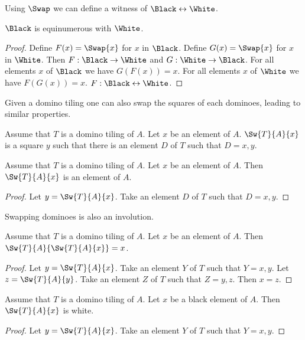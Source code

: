 Using $\Swap$ we can define a witness of $\Black \leftrightarrow \White$.

\begin{forthel}
    \begin{lemma}
        $\Black$ is equinumerous with $\White$.
    \end{lemma}
    \begin{proof}
        Define $F(x) = \Swap{x}$ for $x$ in $\Black$.
        Define $G(x) = \Swap{x}$ for $x$ in $\White$.
        Then $F : \Black \to \White$ and $G : \White \to \Black$.
        For all elements $x$ of $\Black$ we have $G(F(x)) = x$.
        For all elements $x$ of $\White$ we have $F(G(x)) = x$.
        $F : \Black \leftrightarrow \White$.
    \end{proof}
\end{forthel}

Given a domino tiling one can also swap the squares of each dominoes,
leading to similar properties.

\begin{forthel}
    \begin{signature}
        Assume that $T$ is a domino tiling of $A$.
        Let $x$ be an element of $A$.
        $\Sw{T}{A}{x}$ is a square $y$ such that there is an element $D$ of $T$
        such that $D = {x,y}$.
    \end{signature}

    \begin{lemma}
        Assume that $T$ is a domino tiling of $A$.
        Let $x$ be an element of $A$.
        Then $\Sw{T}{A}{x}$ is an element of $A$.
    \end{lemma}
    \begin{proof}
        Let $y = \Sw{T}{A}{x}$.
        Take an element $D$ of $T$ such that $D = {x,y}$.
    \end{proof}
\end{forthel}


Swapping dominoes is also an involution.

\begin{forthel}
    \begin{lemma}
        Assume that $T$ is a domino tiling of $A$. Let $x$ be an element of $A$.
        Then $\Sw{T}{A}{\Sw{T}{A}{x}} = x$.
    \end{lemma}
    \begin{proof}
        Let $y = \Sw{T}{A}{x}$.
        Take an element $Y$ of $T$ such that $Y = {x,y}$.
        Let $z = \Sw{T}{A}{y}$.
        Take an element $Z$ of $T$ such that $Z = {y,z}$.
        Then $x = z$.
    \end{proof}

    \begin{lemma}
        Assume that $T$ is a domino tiling of $A$.
        Let $x$ be a black element of $A$.
        Then $\Sw{T}{A}{x}$ is white.
    \end{lemma}
    \begin{proof}
        Let $y = \Sw{T}{A}{x}$.
        Take an element $Y$ of $T$ such that $Y = {x,y}$.
    \end{proof}
\end{forthel}


